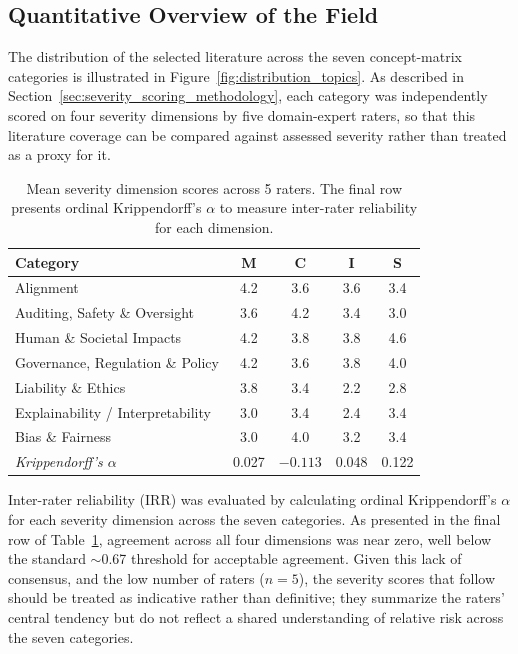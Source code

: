 \begin{toreview}

    \subsection{Quantitative Overview of the Field}\label{subsec:results_quantitative}

    The distribution of the selected literature across the seven concept-matrix categories is illustrated in Figure~\ref{fig:distribution_topics}. As described in Section~\ref{sec:severity_scoring_methodology}, each category was independently scored on four severity dimensions by five domain-expert raters, so that this literature coverage can be compared against assessed severity rather than treated as a proxy for it.

    \begin{table}[h]
        \centering
        \small
        \caption{Mean severity dimension scores across 5 raters. The final row presents ordinal Krippendorff's $\alpha$ to measure inter-rater reliability for each dimension.}
        \label{tab:rater_scores_summary}
        \begin{tabular}{|l|c|c|c|c|}
            \hline
            \textbf{Category} & \textbf{M} & \textbf{C} & \textbf{I} & \textbf{S} \\
            \hline
            Alignment                         & 4.2 & 3.6 & 3.6 & 3.4 \\
            Auditing, Safety \& Oversight     & 3.6 & 4.2 & 3.4 & 3.0 \\
            Human \& Societal Impacts         & 4.2 & 3.8 & 3.8 & 4.6 \\
            Governance, Regulation \& Policy  & 4.2 & 3.6 & 3.8 & 4.0 \\
            Liability \& Ethics               & 3.8 & 3.4 & 2.2 & 2.8 \\
            Explainability / Interpretability & 3.0 & 3.4 & 2.4 & 3.4 \\
            Bias \& Fairness                  & 3.0 & 4.0 & 3.2 & 3.4 \\
            \hline \hline
            \textit{Krippendorff's $\alpha$}  & 0.027 & $-0.113$ & 0.048 & 0.122 \\
            \hline
        \end{tabular}
    \end{table}

    Inter-rater reliability (IRR) was evaluated by calculating ordinal Krippendorff's $\alpha$ for each severity dimension across the seven categories. As presented in the final row of Table~\ref{tab:rater_scores_summary}, agreement across all four dimensions was near zero, well below the standard $\sim$0.67 threshold for acceptable agreement. Given this lack of consensus, and the low number of raters ($n=5$), the severity scores that follow should be treated as indicative rather than definitive; they summarize the raters' central tendency but do not reflect a shared understanding of relative risk across the seven categories.


\end{toreview}
